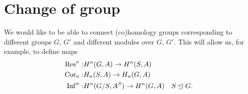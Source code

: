 \section{Change of group}
We would like to be able to connect (co)homology groups corresponding to different groups $G$, $G'$ and different modules over $G$, $G'$. This will allow us, for example, to define maps
\begin{align*}
\operatorname{Res}^n:&H^n(G,A)\to H^n(S,A)\\
\operatorname{Cor}_n:&H_n(S,A)\to H_n(G,A)\\
\operatorname{Inf}^n:&H^n(G/S,A^S)\to H^n(G,A)&S\trianglelefteq G.\\
\end{align*}
